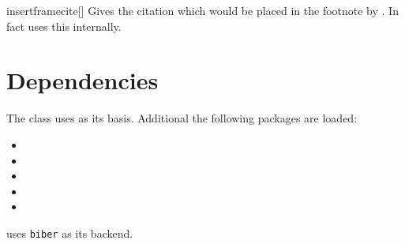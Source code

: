 \begin{describemacro}{insertframecite}[]
  Gives the citation which would be placed in the footnote by . In
  fact  uses this internally.
\end{describemacro}

\section{Dependencies}
The class uses  as its basis. Additional the following packages are
loaded:
\vspace*{-\multicolsep}%
\begin{multicols}{3}
  \begin{itemize}
    \item {}
    \item {}
    \item {}
    \item \TikZ
    \item {}
  \end{itemize}
\end{multicols}
\vspace*{-\multicolsep}%
 uses \texttt{biber} as its backend.
